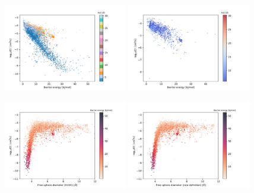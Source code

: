 \documentclass[main]{subfiles}
\begin{document}
\begin{figure}[ht]
  \centering
    \includegraphics[width=0.48\textwidth]{figures/5-diffusion/difflog_barrier_Df_uff.pdf}
    \includegraphics[width=0.48\textwidth]{figures/5-diffusion/difflog_barrier_Df_uff_2.pdf}
    \caption{}\label{fgr:}
\end{figure}

\begin{figure}[ht]
  \centering
    \includegraphics[width=0.48\textwidth]{figures/5-diffusion/difflog_Df-ccdc_barrier.pdf}
    \includegraphics[width=0.48\textwidth]{figures/5-diffusion/difflog_Df-uff298K_barrier.pdf}
    \caption{}\label{fgr:}
\end{figure}
\end{document}
